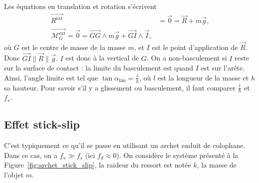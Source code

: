             Les équations en translation et rotation s'écrivent
            \begin{equation}
                \begin{aligned}
                    \vec{R^{\text{ext}}}&=\vec{0}=\vec{R}+m\vec{g},\\
                    \vec{\mathcal{M}_{G}^{\text{ext}}}=\vec{0}=\vec{GG}\wedge m\vec{g}+\vec{GI}\wedge\vec{I},
                \end{aligned}
            \end{equation}
            où $G$ est le centre de masse de la masse $m$, et $I$ est le point d'application de $\vec{R}$. Donc $\vec{GI}\parallel\vec{R}\parallel\vec{g}$. $I$ est donc à la vertical de $G$. On a non-basculement si $I$ reste sur la surface de contact : la limite du basculement est quand $I$ est sur l'arête. Ainsi, l'angle limite est tel que $\tan\alpha_{\text{lim}}=\frac{l}{h}$, où $l$ est la longueur de la masse et $h$ sa hauteur. Pour savoir s'il y a glissement ou basculement, il faut comparer $\frac{l}{h}$ et $f_s$.

    \subsection{Effet \og stick-slip\fg}

        C'est typiquement ce qu'il se passe en utilisant un archet enduit de colophane. Dans ce cas, on a $f_s\gg f_s$ (ici $f_d\approx0$). On considère le système présenté à la Figure~\ref{fig:archet_stick_slip}, la raideur du ressort est notée $k$, la masse de l'objet $m$.


